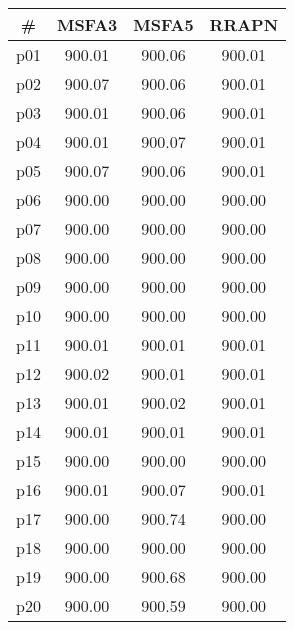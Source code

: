 \begin{tabular}{cccc}
\toprule
\textbf{\#} & \textbf{MSFA3} & \textbf{MSFA5} & \textbf{RRAPN}\\
\midrule
p01 & 900.01 & 900.06 & 900.01\\
p02 & 900.07 & 900.06 & 900.01\\
p03 & 900.01 & 900.06 & 900.01\\
p04 & 900.01 & 900.07 & 900.01\\
p05 & 900.07 & 900.06 & 900.01\\
p06 & 900.00 & 900.00 & 900.00\\
p07 & 900.00 & 900.00 & 900.00\\
p08 & 900.00 & 900.00 & 900.00\\
p09 & 900.00 & 900.00 & 900.00\\
p10 & 900.00 & 900.00 & 900.00\\
p11 & 900.01 & 900.01 & 900.01\\
p12 & 900.02 & 900.01 & 900.01\\
p13 & 900.01 & 900.02 & 900.01\\
p14 & 900.01 & 900.01 & 900.01\\
p15 & 900.00 & 900.00 & 900.00\\
p16 & 900.01 & 900.07 & 900.01\\
p17 & 900.00 & 900.74 & 900.00\\
p18 & 900.00 & 900.00 & 900.00\\
p19 & 900.00 & 900.68 & 900.00\\
p20 & 900.00 & 900.59 & 900.00\\
\bottomrule
\end{tabular}

